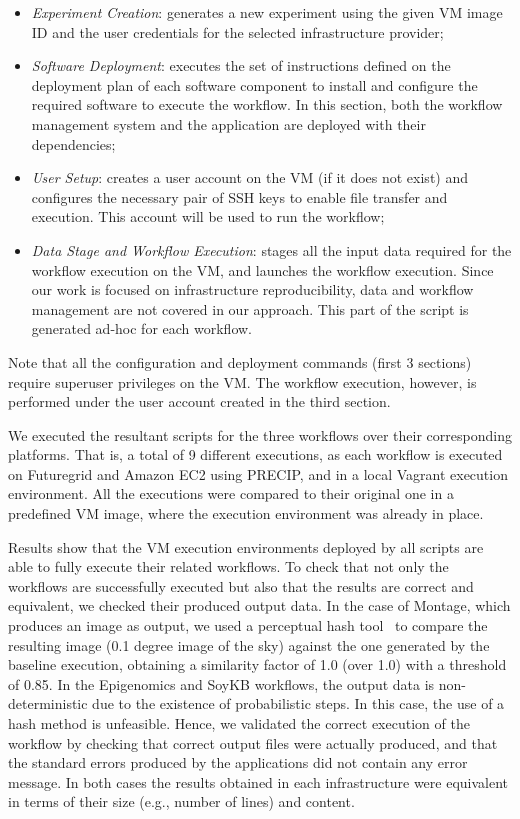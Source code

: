 \begin{itemize}
	\item \emph{Experiment Creation}: generates a new experiment using the 
		given VM image ID and the user credentials for the selected infrastructure 
		provider;
    	    
	\item \emph{Software Deployment}: executes the set of instructions defined on 
		the deployment plan of each software component to install and configure 
		the required software to execute the workflow. In this section, both the 
		workflow management system and the application are deployed with their 
		dependencies;

	\item \emph{User Setup}: creates a user account on the VM (if it does not exist) 
		and configures the necessary pair of SSH keys to enable file transfer and 
		execution. This account will be used to run the workflow;
	   
	\item \emph{Data Stage and Workflow Execution}: stages all the input data required 
		for the workflow execution on the VM, and launches the workflow execution. 
		Since our work is focused on infrastructure reproducibility, data and workflow 
		management are not covered in our approach. This part of the script is 
		generated ad-hoc for each workflow.
\end{itemize}

\noindent Note that all the configuration and deployment commands (first 3 sections) 
require superuser privileges on the VM. The workflow execution, however, is performed 
under the user account created in the third section.

We executed the resultant scripts for the three workflows over their corresponding 
platforms. That is, a total of 9 different executions, as each workflow is executed on  
Futuregrid and Amazon EC2 using PRECIP, and in a local Vagrant execution 
environment. All the executions were compared to their original one in a predefined 
VM image, where the execution environment was already in place.

Results show that the VM execution environments deployed by all scripts are able to
fully execute their related workflows. To check that not only the workflows are successfully executed but also 
that the results are correct and equivalent, we checked their produced output data. In the 
case of Montage, which produces an image as output, we used a perceptual hash tool~\cite{phash}
to compare the resulting image (0.1 degree image of the sky) against the one generated 
by the baseline execution, obtaining a similarity factor of 1.0 (over 1.0) with a threshold of 
0.85. In the Epigenomics and SoyKB workflows, the output data is non-deterministic due to
the existence of probabilistic steps. In this case, the use of a hash method is unfeasible. 
Hence, we validated the correct execution of the workflow by checking that correct output 
files were actually produced, and that the standard errors produced by the applications did not contain any error message.
In both cases the results obtained in each infrastructure were equivalent in terms of their size (e.g., number of lines) 
and content.

